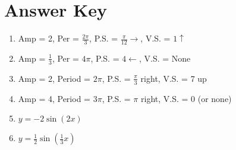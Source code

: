 \newpage

\section{Answer Key}

\begin{enumerate}
	\item Amp = 2, Per = $\frac{2\pi}{3}$, P.S. = $\frac{\pi}{12} \rightarrow$, V.S. = $1 \uparrow$
    \item Amp = $\frac{1}{3}$, Per = $4\pi$, P.S. = $4 \leftarrow$, V.S. = None
    \item Amp = 2, Period = $2\pi$, P.S. = $\frac{\pi}{3}$ right, V.S. = 7 up
    \item Amp = 4, Period = $3\pi$, P.S. = $\pi$ right, V.S. = 0 (or none)
    
    \item $y = -2\sin(2x)$
	\item $y = \frac{1}{2}\sin\left(\frac{1}{3}x\right)$
\end{enumerate}
